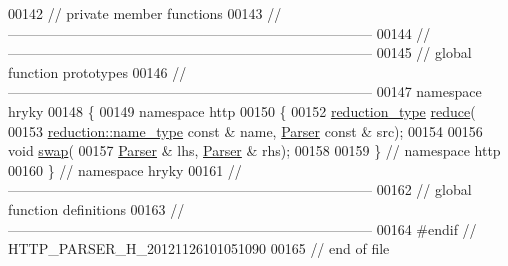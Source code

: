 \begin{DoxyCode}
00142 \textcolor{comment}{// private member functions}
00143 \textcolor{comment}{//
      ------------------------------------------------------------------------------}
00144 \textcolor{comment}{//
      ------------------------------------------------------------------------------}
00145 \textcolor{comment}{// global function prototypes}
00146 \textcolor{comment}{//
      ------------------------------------------------------------------------------}
00147 \textcolor{keyword}{namespace }hryky
00148 \{
00149 \textcolor{keyword}{namespace }http
00150 \{
00152     \hyperlink{classhryky_1_1_intrusive_ptr}{reduction_type} \hyperlink{namespacehryky_1_1http_a08fc36a78a8e2908140fcd102829a566}{reduce}(
00153         \hyperlink{classhryky_1_1reduction_1_1_string}{reduction::name_type} \textcolor{keyword}{const} & name, \hyperlink{classhryky_1_1http_1_1_parser}{Parser} \textcolor{keyword}{const} & src);
00154 
00156     \textcolor{keywordtype}{void} \hyperlink{namespacehryky_1_1http_a38e62595ad532d18fbc65ceb61973aec}{swap}(
00157         \hyperlink{classhryky_1_1http_1_1_parser}{Parser} & lhs, \hyperlink{classhryky_1_1http_1_1_parser}{Parser} & rhs);
00158 
00159 \} \textcolor{comment}{// namespace http}
00160 \} \textcolor{comment}{// namespace hryky}
00161 \textcolor{comment}{//
      ------------------------------------------------------------------------------}
00162 \textcolor{comment}{// global function definitions}
00163 \textcolor{comment}{//
      ------------------------------------------------------------------------------}
00164 \textcolor{preprocessor}{#endif // HTTP\_PARSER\_H\_20121126101051090}
00165 \textcolor{preprocessor}{}\textcolor{comment}{// end of file}
\end{DoxyCode}
